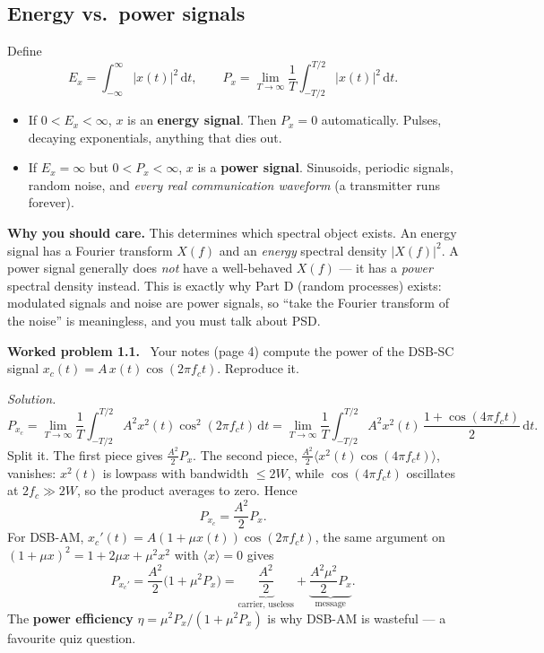 \documentclass[11pt,a4paper]{article}
\newcommand{\dd}{\,\mathrm{d}}
\newenvironment{worked}[1]{\par\vspace{4pt}\noindent\textbf{\color{warmred}Worked problem #1.}\ \ignorespaces}{\par\vspace{4pt}}
\newcommand{\soln}{\par\vspace{2pt}\noindent\textit{Solution.}\ \ignorespaces}
\begin{document}
\subsection{Energy vs.\ power signals}

Define
\[
E_x = \int_{-\infty}^{\infty}|x(t)|^2\dd t,
\qquad
P_x = \lim_{T\to\infty}\frac{1}{T}\int_{-T/2}^{T/2}|x(t)|^2\dd t .
\]

\begin{itemize}[leftmargin=*]
\item If $0<E_x<\infty$, $x$ is an \textbf{energy signal}. Then $P_x=0$ automatically. Pulses, decaying
exponentials, anything that dies out.
\item If $E_x=\infty$ but $0<P_x<\infty$, $x$ is a \textbf{power signal}. Sinusoids, periodic signals, random
noise, and \emph{every real communication waveform} (a transmitter runs forever).
\end{itemize}

\begin{keybox}
\textbf{Why you should care.} This determines which spectral object exists.
An energy signal has a Fourier transform $X(f)$ and an \emph{energy} spectral density $|X(f)|^2$.
A power signal generally does \emph{not} have a well-behaved $X(f)$ --- it has a \emph{power} spectral
density instead. This is exactly why Part D (random processes) exists: modulated signals and noise are power
signals, so ``take the Fourier transform of the noise'' is meaningless, and you must talk about PSD.
\end{keybox}

\begin{worked}{1.1}
Your notes (page 4) compute the power of the DSB-SC signal $x_c(t)=A\,x(t)\cos(2\pi f_c t)$. Reproduce it.
\end{worked}
\soln
\[
P_{x_c}=\lim_{T\to\infty}\frac1T\int_{-T/2}^{T/2}A^2x^2(t)\cos^2(2\pi f_c t)\dd t
=\lim_{T\to\infty}\frac1T\int_{-T/2}^{T/2}A^2x^2(t)\,\frac{1+\cos(4\pi f_c t)}{2}\dd t .
\]
Split it. The first piece gives $\tfrac{A^2}{2}P_x$. The second piece,
$\tfrac{A^2}{2}\langle x^2(t)\cos(4\pi f_ct)\rangle$, vanishes: $x^2(t)$ is lowpass with bandwidth $\le 2W$,
while $\cos(4\pi f_c t)$ oscillates at $2f_c\gg 2W$, so the product averages to zero. Hence
\[
\boxed{P_{x_c}=\frac{A^2}{2}P_x}.
\]
For DSB-AM, $x_c'(t)=A(1+\mu x(t))\cos(2\pi f_ct)$, the same argument on $(1+\mu x)^2 = 1+2\mu x+\mu^2x^2$
with $\langle x\rangle=0$ gives
\[
P_{x_c'}=\frac{A^2}{2}\big(1+\mu^2 P_x\big)=\underbrace{\frac{A^2}{2}}_{\text{carrier, useless}}+\underbrace{\frac{A^2\mu^2}{2}P_x}_{\text{message}} .
\]
The \textbf{power efficiency} $\eta=\mu^2P_x/(1+\mu^2P_x)$ is why DSB-AM is wasteful --- a favourite quiz question.
\end{document}
